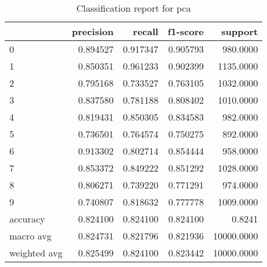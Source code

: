 \begin{table}
\centering
\caption{Classification report for pca}
\label{tab:pca}
\begin{tabular}{lrrrr}
\toprule
{} &  precision &    recall &  f1-score &     support \\
\midrule
0            &   0.894527 &  0.917347 &  0.905793 &    980.0000 \\
1            &   0.850351 &  0.961233 &  0.902399 &   1135.0000 \\
2            &   0.795168 &  0.733527 &  0.763105 &   1032.0000 \\
3            &   0.837580 &  0.781188 &  0.808402 &   1010.0000 \\
4            &   0.819431 &  0.850305 &  0.834583 &    982.0000 \\
5            &   0.736501 &  0.764574 &  0.750275 &    892.0000 \\
6            &   0.913302 &  0.802714 &  0.854444 &    958.0000 \\
7            &   0.853372 &  0.849222 &  0.851292 &   1028.0000 \\
8            &   0.806271 &  0.739220 &  0.771291 &    974.0000 \\
9            &   0.740807 &  0.818632 &  0.777778 &   1009.0000 \\
accuracy     &   0.824100 &  0.824100 &  0.824100 &      0.8241 \\
macro avg    &   0.824731 &  0.821796 &  0.821936 &  10000.0000 \\
weighted avg &   0.825499 &  0.824100 &  0.823442 &  10000.0000 \\
\bottomrule
\end{tabular}
\end{table}

